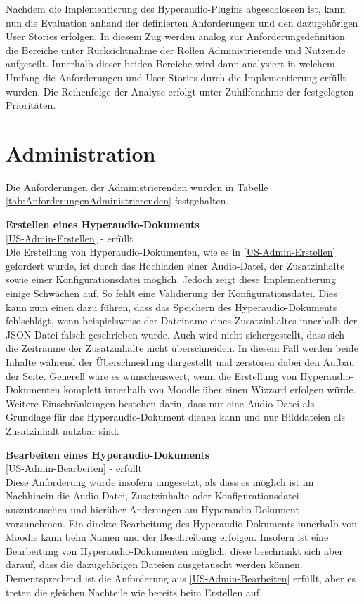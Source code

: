\label{cap:evaluation}
Nachdem die Implementierung des Hyperaudio-Plugins abgeschlossen ist, kann nun die Evaluation anhand der definierten Anforderungen und den dazugehörigen User Stories erfolgen. In diesem Zug werden analog zur Anforderungsdefinition die Bereiche unter Rücksichtnahme der Rollen Administrierende und Nutzende aufgeteilt. Innerhalb dieser beiden Bereiche wird dann analysiert in welchem Umfang die Anforderungen und User Stories durch die Implementierung erfüllt wurden. Die Reihenfolge der Analyse erfolgt unter Zuhilfenahme der festgelegten Prioritäten.

\section{Administration}
\label{sec:eval_administration}
Die Anforderungen der Administrierenden wurden in Tabelle \ref{tab:AnforderungenAdministrierenden} festgehalten.


\textbf{Erstellen eines Hyperaudio-Dokuments}\\
\ref{US-Admin-Erstellen} - erfüllt\\
Die Erstellung von Hyperaudio-Dokumenten, wie es in \ref{US-Admin-Erstellen} gefordert wurde, ist durch das Hochladen einer Audio-Datei, der Zusatzinhalte sowie einer Konfigurationsdatei möglich. Jedoch zeigt diese Implementierung einige Schwächen auf. So fehlt eine Validierung der Konfigurationsdatei. Dies kann zum einen dazu führen, dass das Speichern des Hyperaudio-Dokuments fehlschlägt, wenn beispielsweise der Dateiname eines Zusatzinhaltes innerhalb der JSON-Datei falsch geschrieben wurde. Auch wird nicht sichergestellt, dass sich die Zeiträume der Zusatzinhalte nicht überschneiden. In diesem Fall werden beide Inhalte während der Überschneidung dargestellt und zerstören dabei den Aufbau der Seite. Generell wäre es wünschenswert, wenn die Erstellung von Hyperaudio-Dokumenten komplett innerhalb von Moodle über einen Wizzard erfolgen würde. Weitere Einschränkungen bestehen darin, dass nur eine Audio-Datei als Grundlage für das Hyperaudio-Dokument dienen kann und nur Bilddateien als Zusatzinhalt nutzbar sind.

\textbf{Bearbeiten eines Hyperaudio-Dokuments}\\
\ref{US-Admin-Bearbeiten} - erfüllt\\
Diese Anforderung wurde insofern umgesetzt, als dass es möglich ist im Nachhinein die Audio-Datei, Zusatzinhalte oder Konfigurationsdatei auszutauschen und hierüber Änderungen am Hyperaudio-Dokument vorzunehmen. Ein direkte Bearbeitung des Hyperaudio-Dokuments innerhalb von Moodle kann beim Namen und der Beschreibung erfolgen. Insofern ist eine Bearbeitung von Hyperaudio-Dokumenten möglich, diese beschränkt sich aber darauf, dass die dazugehörigen Dateien ausgetauscht werden können. Dementsprechend ist die Anforderung aus \ref{US-Admin-Bearbeiten} erfüllt, aber es treten die gleichen Nachteile wie bereits beim Erstellen auf.

